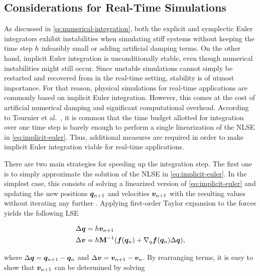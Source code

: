\subsection{Considerations for Real-Time Simulations}\label{ss:numerical-integration-rt}
As discussed in \cref{ss:numerical-integration}, both the explicit and symplectic Euler integrators exhibit instabilities when simulating
stiff systems without keeping the time step $h$ infeasibly small or adding artificial damping terms. On the other hand, implicit Euler integration
is unconditionally stable, even though numerical instabilities might still occur. Since unstable simulations cannot simply be restarted and 
recovered from in the real-time setting, stability is of utmost importance. For that reason, physical simulations for real-time applications
are commonly based on implicit Euler integration. However, this comes at the cost of artificial numerical damping and significant computational
overhead. According to Tournier et al.\ \cite{tournier2015}, it is common that the time budget allotted for integration over one time step is 
barely enough to perform a single linearization of the NLSE in \cref{eq:implicit-euler}. Thus, additional measures are required in order to make
implicit Euler integration viable for real-time applications. 

There are two main strategies for speeding up the integration step. The first one is to simply approximate the solution of the NLSE in
\autoref{eq:implicit-euler}. In the simplest case, this consists of solving a linearized version of \autoref{eq:implicit-euler} and updating 
the new positions $\bm{q}_{n+1}$ and velocities $\bm{v}_{n+1}$ with the resulting values without iterating any further \cite{baraff1998}. 
Applying first-order Taylor expansion to the forces yields the following LSE

\begin{equation}\label{eq:linear-implicit-lse}
    \begin{split}
    \Delta \bm{q} &= h \bm{v}_{n+1} \\
    \Delta \bm{v} &= h \mathbf{M}^{-1}(\bm{f}(\bm{q}_n) + \nabla_q \bm{f}(\bm{q}_n) \Delta \bm{q}),
    \end{split}
\end{equation}

\noindent where $\Delta \bm{q} = \bm{q}_{n+1} - \bm{q}_n$ and $\Delta \bm{v} = \bm{v}_{n+1} - \bm{v}_n$. By rearranging terms, it is 
easy to show that $\bm{v}_{n+1}$ can be determined by solving

